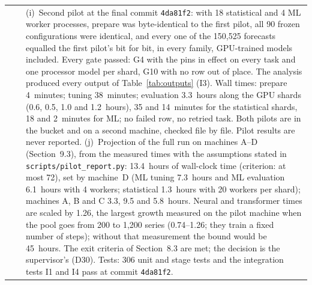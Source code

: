 \documentclass[11pt,a4paper]{article}
\newcommand{\code}[1]{\texttt{#1}}
\begin{document}
\begin{longtable}{@{}p{1.3cm} p{1.9cm} p{11.8cm}@{}}
 & & (i)~Second pilot at the final commit \code{4da81f2}: with 18 statistical and 4 ML worker processes, prepare was byte-identical to the first pilot, all 90 frozen configurations were identical, and every one of the 150,525 forecasts equalled the first pilot's bit for bit, in every family, GPU-trained models included. Every gate passed: G4 with the pins in effect on every task and one processor model per shard, G10 with no row out of place. The analysis produced every output of Table~\ref{tab:outputs} (I3). Wall times: prepare 4~minutes; tuning 38~minutes; evaluation 3.3~hours along the GPU shards (0.6, 0.5, 1.0 and 1.2~hours), 35 and 14~minutes for the statistical shards, 18 and 2~minutes for ML; no failed row, no retried task. Both pilots are in the bucket and on a second machine, checked file by file. Pilot results are never reported. (j)~Projection of the full run on machines A--D (Section~9.3), from the measured times with the assumptions stated in \mbox{\code{scripts/pilot_report.py}}: 13.4~hours of wall-clock time (criterion: at most 72), set by machine~D (ML tuning 7.3~hours and ML evaluation 6.1~hours with 4 workers; statistical 1.3~hours with 20 workers per shard); machines A, B and C 3.3, 9.5 and 5.8~hours. Neural and transformer times are scaled by 1.26, the largest growth measured on the pilot machine when the pool goes from 200 to 1,200 series (0.74--1.26; they train a fixed number of steps); without that measurement the bound would be 45~hours. The exit criteria of Section~8.3 are met; the decision is the supervisor's (D30). Tests: 306 unit and stage tests and the integration tests I1 and I4 pass at commit \code{4da81f2}. \\

\end{longtable}
\end{document}
